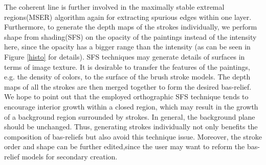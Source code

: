 \newline
The coherent line is further involved in the maximally stable extremal regions(MSER) algorithm \cite{donoser2006efficient} again for extracting spurious edges within one layer.\\
Furthermore, to generate the depth maps of the strokes individually, we perform shape from shading(SFS) on the opacity of the paintings instead of the intensity here, since the opacity has a bigger range than the intensity (as can be seen in Figure \ref{histo} for details). SFS techniques may generate details of surfaces in terms of image texture. It is desirable to transfer the features of the paintings, e.g. the density of colors, to the surface of the brush stroke models.
\newline
The depth maps of all the strokes are then merged together to form the desired bas-relief. We hope to point out that the employed orthographic SFS technique tends to encourage interior growth within a closed region, which may result in the growth of a background region surrounded by strokes. In general, the background plane should be unchanged. Thus, generating strokes individually not only benefits the composition of bas-reliefs but also avoid this technique issue.
Moreover, the stroke order and shape can be further edited,since the user may want to reform the bas-relief models for secondary creation.
\newpage 